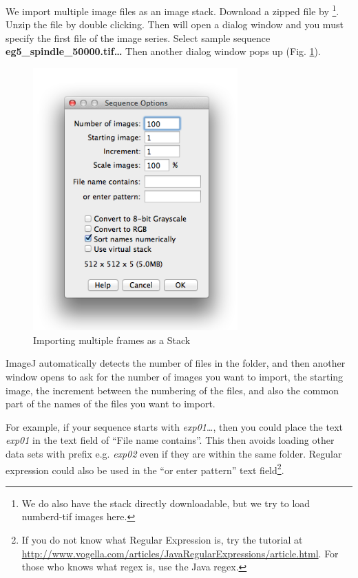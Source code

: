 \begin{indentexercise}{1}
We import multiple image files as an image stack. Download a zipped file by  \footnote{We do also have the stack directly downloadable, but we try to load numberd-tif images here.}. Unzip the file by double clicking. Then
 will open a dialog window and
you must specify the first file of the image series. Select sample sequence
\textbf{eg5\_spindle\_50000.tif\ldots} Then another dialog window pops up (Fig.
\ref{fig:img129}).

\begin{figure}[H]
\begin{center}
\includegraphics[width=0.7\textwidth]{fig/importSeriesDialog.png}
\caption{ Importing multiple frames as a Stack}
\label{fig:img129}
\end{center}
\end{figure}

ImageJ automatically detects the number of files in the folder, and then another
window opens to ask for the number of images you want to import, the starting image, the increment between the numbering of the files, and also
the common part of the names of the files you want to import.

For example, if your sequence starts with \textit{exp01}\ldots, then you could place the text \textit{exp01} in the text field of ``File name contains''. This then avoids loading other data sets with prefix e.g. \textit{exp02} even if they are within the same folder. Regular expression could also be used in the ``or enter pattern'' text field\footnote{If you do not know what Regular Expression is, try the tutorial at \url{http://www.vogella.com/articles/JavaRegularExpressions/article.html}. For those who knows what regex is, use the Java regex.}. 


\end{indentexercise}
